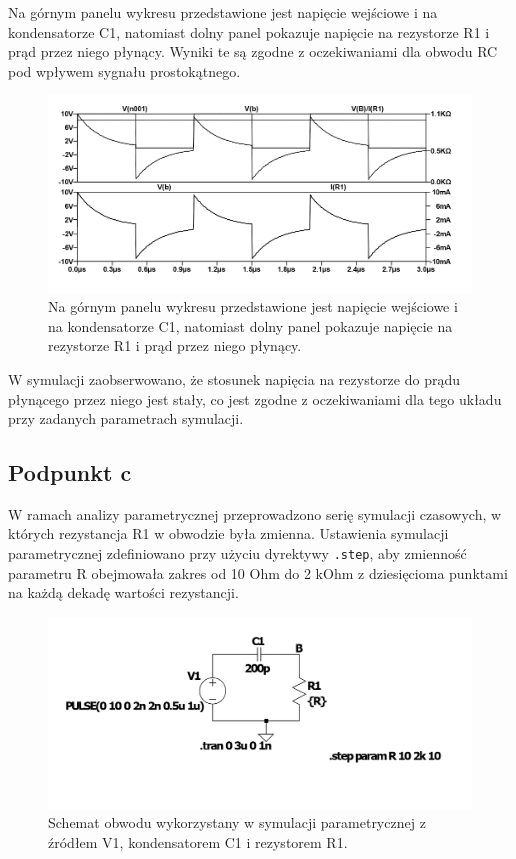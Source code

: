 \documentclass[10pt]{article}
\begin{document}
	Na górnym panelu wykresu przedstawione jest napięcie wejściowe i na kondensatorze C1, natomiast dolny panel pokazuje napięcie na rezystorze R1 i prąd przez niego płynący. Wyniki te są zgodne z oczekiwaniami dla obwodu RC pod wpływem sygnału prostokątnego.
	
	\begin{figure}[H]
		\centering
		\includegraphics[width=\linewidth]{3bwykres}
		\caption{Na górnym panelu wykresu przedstawione jest napięcie wejściowe i na kondensatorze C1, natomiast dolny panel pokazuje napięcie na rezystorze R1 i prąd przez niego płynący.}
		\label{fig:3bwykres}
	\end{figure}
	
	W symulacji zaobserwowano, że stosunek napięcia na rezystorze do prądu płynącego przez niego jest stały, co jest zgodne z oczekiwaniami dla tego układu przy zadanych parametrach symulacji.


	
	\pagebreak
	\subsection*{Podpunkt c}
	W ramach analizy parametrycznej przeprowadzono serię symulacji czasowych, w których rezystancja R1 w obwodzie była zmienna. Ustawienia symulacji parametrycznej zdefiniowano przy użyciu dyrektywy \texttt{.step}, aby zmienność parametru R obejmowała zakres od 10 Ohm do 2 kOhm z dziesięcioma punktami na każdą dekadę wartości rezystancji.
	
	\begin{figure}[H]
		\centering
		\includegraphics[width=0.8\linewidth]{3cobwod}
		\caption{Schemat obwodu wykorzystany w symulacji parametrycznej z źródłem V1, kondensatorem C1 i rezystorem R1.}
		\label{fig:3cobwod}
	\end{figure}
	
\end{document}

